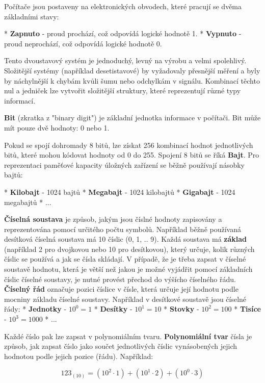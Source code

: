 Počítače jsou postaveny na elektronických obvodech, které pracují se dvěma základními stavy:

\begitems
* {\bf Zapnuto} - proud prochází, což odpovídá logické hodnotě 1.
* {\bf Vypnuto} - proud neprochází, což odpovídá logické hodnotě 0.
\enditems

Tento dvoustavový systém je jednoduchý, levný na výrobu a velmi spolehlivý. Složitější systémy (například desetistavové) by vyžadovaly přesnější měření a byly by náchylnější k chybám kvůli šumu nebo odchylkám v signálu. Kombinací těchto nul a jedniček lze vytvořit složitější struktury, které reprezentují různé typy informací. 

{\bf Bit} (zkratka z "binary digit") je základní jednotka informace v počítači. Bit může mít pouze dvě hodnoty: 0 nebo 1. 

Pokud se spojí dohromady 8 bitů, lze získat 256 kombinací hodnot jednotlivých bitů, které mohou kódovat hodnoty od 0 do 255. Spojení 8 bitů se říká {\bf Bajt}. Pro reprezentaci paměťové kapacity úložných zařízení se běžně používají násobky bajtů:

\begitems
* {\bf Kilobajt} - 1024 bajtů
* {\bf Megabajt} - 1024 kilobajtů
* {\bf Gigabajt} - 1024 megabajtů
* ...
\enditems

{\bf Číselná soustava} je způsob, jakým jsou číslné hodnoty zapisovány a reprezentována pomocí určitého počtu symbolů. Například běžně používaná desítková číselná soustava má 10 číslic (0, 1, .. 9). Každá soustava má {\bf základ} (například 2 pro dvojkovou nebo 10 pro desítkovou), který určuje, kolik různých číslic se používá a jak se čísla skládají. V případě, že je třeba zapsat v číselné soustavě hodnotu, která je větší než jakou je možné vyjádřit pomocí základních číslic číselné soustavy, je nutné provést přechod do výšícho číselného řádu. {\bf Číselný řád} označuje pozici číslice v čísle, která určuje její hodnotu podle mocniny základu číselné soustavy. Například v desítkové soustavě jsou číselné řády:
\begitems 
* {\bf Jednotky} - $10^0 = 1$
* {\bf Desítky} - $10^1 = 10$
* {\bf Stovky} - $10^2 = 100$
* {\bf Tisíce} - $10^3 = 1000$
* ...
\enditems

Každé číslo pak lze zapsat v polynomiálním tvaru. {\bf Polynomiální tvar} čísla je způsob, jak zapsat číslo jako součet jednotlivých číslic vynásobených jejich hodnotou podle jejich pozice (řádu). Například:

$$
123_{(10)} = (10^2 \cdot 1) + (10^1 \cdot 2) + (10^0 \cdot 3)
$$

